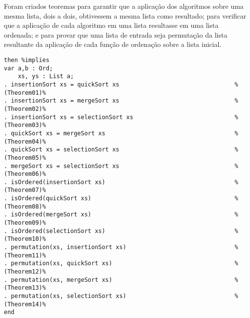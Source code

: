 Foram criados teoremas para garantir que a aplicação dos algoritmos sobre uma mesma lista, dois a dois, obtivessem a mesma lista como resultado;
para verificar que a aplicação de cada algoritmo em uma lista resultasse em uma lista ordenada;
e para provar que uma lista de entrada seja permutação da lista resultante da aplicação de cada função de ordenação sobre a lista inicial.

\begin{Verbatim}
then %implies
var a,b : Ord;                                      
    xs, ys : List a;                                
. insertionSort xs = quickSort xs                                 %(Theorem01)%
. insertionSort xs = mergeSort xs                                 %(Theorem02)%
. insertionSort xs = selectionSort xs                             %(Theorem03)%
. quickSort xs = mergeSort xs                                     %(Theorem04)%
. quickSort xs = selectionSort xs                                 %(Theorem05)%
. mergeSort xs = selectionSort xs                                 %(Theorem06)%
. isOrdered(insertionSort xs)                                     %(Theorem07)%
. isOrdered(quickSort xs)                                         %(Theorem08)%
. isOrdered(mergeSort xs)                                         %(Theorem09)%
. isOrdered(selectionSort xs)                                     %(Theorem10)%
. permutation(xs, insertionSort xs)                               %(Theorem11)%
. permutation(xs, quickSort xs)                                   %(Theorem12)%
. permutation(xs, mergeSort xs)                                   %(Theorem13)%
. permutation(xs, selectionSort xs)                               %(Theorem14)%
end
\end{Verbatim}
